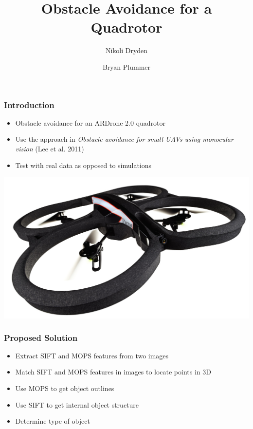 \documentclass[xcolor=x11names,compress,t]{beamer}
\renewcommand{\(}{\begin{columns}}
\renewcommand{\)}{\end{columns}}
\newcommand{\<}[1]{\begin{column}{#1}}
\renewcommand{\>}{\end{column}}
\begin{document}
\abovedisplayskip=6pt

%
%

\begin{frame}
\title{Obstacle Avoidance for a Quadrotor}
\author{Nikoli Dryden \and Bryan Plummer}
\date{}
\titlepage
\end{frame}


\begin{frame}
  \frametitle{Introduction}
  \begin{itemize}
  \item Obstacle avoidance for an ARDrone 2.0 quadrotor
  \item Use the approach in \emph{Obstacle avoidance for small UAVs using monocular vision} (Lee et al. 2011)
  \item Test with real data as opposed to simulations
  \end{itemize}
  \begin{center}
    \includegraphics[resolution=150, scale=0.5]{images/ardrone2}
  \end{center}
\end{frame}

\begin{frame}
  \frametitle{Proposed Solution}
  \begin{itemize}
  \item Extract SIFT and MOPS features from two images
  \item Match SIFT and MOPS features in images to locate points in 3D
  \item Use MOPS to get object outlines
  \item Use SIFT to get internal object structure
  \item Determine type of object
  \end{itemize}
\end{frame}
\end{document}
